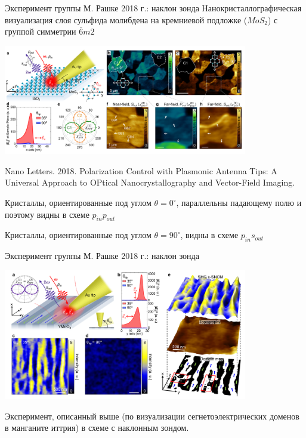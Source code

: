 \documentclass[9pt, compress, xcolor=table]{beamer}
\begin{document}
\begin{frame}{Эксперимент группы М. Рашке 2018 г.: наклон зонда}
Нанокристаллографическая визуализация слоя сульфида молибдена на кремниевой подложке ($MoS_2$) с группой симметрии $\bar{6}m2$

\begin{center}
\includegraphics[width=0.8\textwidth]{shg32}


\small{Nano Letters. 2018. Polarization Control with Plasmonic Antenna Tips: A Universal Approach to OPtical Nanocrystallography and Vector-Field Imaging.}
\end{center}

Кристаллы, ориентированные под углом $\theta = 0^\circ$, параллельны падающему полю и поэтому видны в схеме $p_{in}p_{out}$ 

Кристаллы, ориентированные под углом $\theta = 90^\circ$, видны в схеме $p_{in}s_{out}$

\end{frame}

\begin{frame}{Эксперимент группы М. Рашке 2018 г.: наклон зонда}

\begin{center}
\includegraphics[width=0.8\textwidth]{shg33}

\end{center}

Эксперимент, описанный выше (по визуализации сегнетоэлектрических доменов в манганите иттрия) в схеме с наклонным зондом.

\end{frame}
\end{document}
